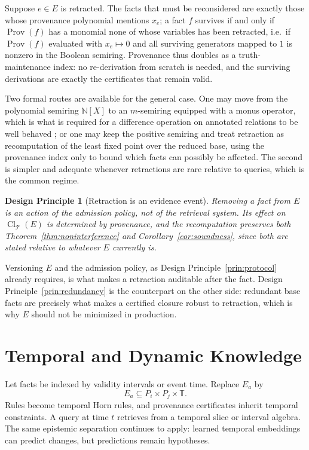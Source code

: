 \documentclass[11pt]{article}
\newtheorem{principle}[definition]{Design Principle}
\newcommand{\Cl}{\operatorname{Cl}}
\newcommand{\Prov}{\operatorname{Prov}}
\newcommand{\T}{\mathcal{T}}
\begin{document}
Suppose $e\in E$ is retracted. The facts that must be reconsidered are exactly those whose provenance polynomial mentions $x_e$; a fact $f$ survives if and only if $\Prov(f)$ has a monomial none of whose variables has been retracted, i.e.\ if $\Prov(f)$ evaluated with $x_e\mapsto0$ and all surviving generators mapped to $1$ is nonzero in the Boolean semiring. Provenance thus doubles as a truth-maintenance index: no re-derivation from scratch is needed, and the surviving derivations are exactly the certificates that remain valid.

Two formal routes are available for the general case. One may move from the polynomial semiring $\mathbb{N}[X]$ to an $m$-semiring equipped with a monus operator, which is what is required for a difference operation on annotated relations to be well behaved \citep{geerts2010}; or one may keep the positive semiring and treat retraction as recomputation of the least fixed point over the reduced base, using the provenance index only to bound which facts can possibly be affected. The second is simpler and adequate whenever retractions are rare relative to queries, which is the common regime.

\begin{principle}[Retraction is an evidence event]
\label{prin:retraction}
Removing a fact from $E$ is an action of the admission policy, not of the retrieval system. Its effect on $\Cl_{\T}(E)$ is determined by provenance, and the recomputation preserves both Theorem~\ref{thm:noninterference} and Corollary~\ref{cor:soundness}, since both are stated relative to whatever $E$ currently is.
\end{principle}

Versioning $E$ and the admission policy, as Design Principle~\ref{prin:protocol} already requires, is what makes a retraction auditable after the fact. Design Principle~\ref{prin:redundancy} is the counterpart on the other side: redundant base facts are precisely what makes a certified closure robust to retraction, which is why $E$ should not be minimized in production.

\section{Temporal and Dynamic Knowledge}

Let facts be indexed by validity intervals or event time. Replace $E_a$ by
\[
E_a\subseteq P_i\times P_j\times\mathbb{T}.
\]
Rules become temporal Horn rules, and provenance certificates inherit temporal constraints. A query at time $t$ retrieves from a temporal slice or interval algebra. The same epistemic separation continues to apply: learned temporal embeddings can predict changes, but predictions remain hypotheses.
\end{document}
